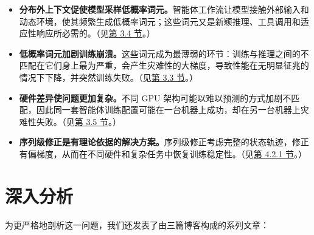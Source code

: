 \begin{itemize}

\item \textbf{分布外上下文促使模型采样低概率词元。}智能体工作流让模型接触外部输入和动态环境，使其频繁生成低概率词元；这些词元又是新颖推理、工具调用和适应性响应所必需的。（见\hyperlink{src-271211a5-58b7-8050-b3b1-dbbad2a1eb40}{第 3.4 节}。）


\item \textbf{低概率词元加剧训练崩溃。}这些词元成为最薄弱的环节：训练与推理之间的不匹配在它们身上最为严重，会产生灾难性的大梯度，导致性能在无明显征兆的情况下下降，并突然训练失败。（见\hyperlink{src-271211a5-58b7-8043-9a6b-f4222291f060}{第 3.3 节}。）


\item \textbf{硬件差异使问题更加复杂。}不同 GPU 架构可能以难以预测的方式加剧不匹配，因此同一套智能体训练配置可能在一台机器上成功，却在另一台机器上灾难性失败。（见\hyperlink{src-271211a5-58b7-80c9-ad90-f8aa1353bfe1}{第 3.5 节}。）


\item \textbf{序列级修正是有理论依据的解决方案。}序列级修正考虑完整的状态轨迹，修正有偏梯度，从而在不同硬件和复杂任务中恢复训练稳定性。（见\hyperlink{src-27b211a5-58b7-8099-ba48-fa8849ab54c8}{第 4.2.1 节}。）

\end{itemize}



\hypertarget{src-2bd211a5-58b7-80b4-974c-c6987ef77b41}{}
\section*{深入分析}
{}



为更严格地剖析这一问题，我们还发表了由三篇博客构成的系列文章：


